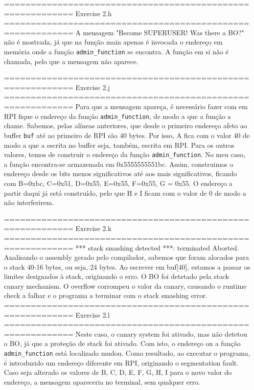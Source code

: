 ===========================================================
Exercise 2.h
===========================================================
A mensagem "Become SUPERUSER! Was there a BO?" não é mostrada, já que na função main apenas é invocada o endereço em memória onde a função
\texttt{admin_function} se encontra. A função em si não é chamada, pelo que a mensagem não aparece.

===========================================================
Exercise 2.j
===========================================================
Para que a mensagem apareça, é necessário fazer com em RPI fique o endereço da função \texttt{admin_function}, de modo a que a função a chame.
Sabemos, pelas alíneas anteriores, que desde o primeiro endereço afeto ao buffer \texttt{buf} até ao primeiro de RPI são 40 bytes. Por isso, A fica com 
o valor 40 de modo a que a escrita no buffer seja, também, escrita em RPI. Para os outros valores, temos de construir o endereço da função 
\texttt{admin_function}. No meu caso, a função encontra-se armazenada em 0x5555555551bc.
Assim, construimos o endereço desde os bits menos significativos até aos mais significativos, ficando com B=0xbc, C=0x51, D=0x55,
E=0x55, F=0x55, G = 0x55. O endereço a partir daqui já está construído, pelo que H e I ficam com o valor de 0 de modo a não interferirem.

===========================================================
Exercise 2.k
===========================================================
*** stack smashing detected ***: terminated
Aborted.
Analisando o assembly gerado pelo compilador, sabemos que foram alocados para o stack 40-16 bytes, ou seja, 24 bytes.
Ao escrever em buf[40], estamos a passar os limites designados à stack, originando o erro.
O BO foi detetado pela stack canary mechanism. O overflow corrompeu o valor da canary, causando o runtime check a falhar e o programa a terminar com o
stack smashing error.
===========================================================
Exercise 2.l
===========================================================
Neste caso, o canary system foi ativado, mas não detetou o BO, já que a proteção de stack foi ativado.
Com isto, o endereço on a função \texttt{admin_function} está localizado mudou. Como resultado, ao executar o programa, é introduzido um endereço diferente 
em RPI, originando o segmentation fault. Caso seja alterado os valores de B, C, D, E, F, G, H, I para o novo valor do endereço, a mensagem apareceria 
no terminal, sem qualquer erro. 